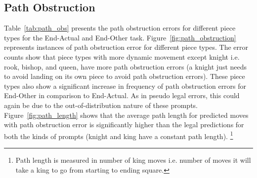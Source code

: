 \documentclass[12pt]{thesis-umich}[thesis]
\begin{document}
\begin{figure*}[!ht]
\end{figure*} 
\subsection{Path Obstruction}
Table~\ref{tab:path_obs} presents the path obstruction errors for different piece types for the End-Actual and End-Other task. Figure~\ref{fig:path_obstruction} represents instances of path obstruction error for different piece types.  
The error counts show that piece types with more dynamic movement except knight i.e. rook, bishop, and queen, have more path obstruction errors  (a knight just needs to avoid landing on its own piece to avoid path obstruction errors). 
These piece types also show a significant increase in frequency of path obstruction errors for End-Other in comparison to End-Actual. As in pseudo legal errors, this could again be due to the out-of-distribution nature of these prompts. Figure~\ref{fig:path_length} shows that the average path length for predicted moves with path obstruction error is significantly higher than the legal predictions for both the kinds of prompts (knight and king have a constant path length). \footnote{Path length is measured in number of king moves i.e. number of moves it will take a king to go from starting to ending square.}
\end{document}
